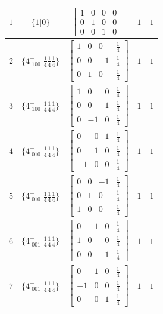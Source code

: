 \documentclass[fleqn,8pt]{jsarticle}
\begin{document}
\begin{longtable}{ccccc}
$ 1 $ & $ \{1|0\} $ & $ \begin{bmatrix} 1 & 0 & 0 & 0 \\ 0 & 1 & 0 & 0 \\ 0 & 0 & 1 & 0 \end{bmatrix} $ & $ 1 $ & $ 1 $ \\ \hline
$ 2 $ & $ \{4^{+}_{\,\,100}|\frac{1}{4} \frac{1}{4} \frac{1}{4}\} $ & $ \begin{bmatrix} 1 & 0 & 0 & \frac{1}{4} \\ 0 & 0 & -1 & \frac{1}{4} \\ 0 & 1 & 0 & \frac{1}{4} \end{bmatrix} $ & $ 1 $ & $ 1 $ \\ \hline
$ 3 $ & $ \{4^{-}_{\,\,100}|\frac{1}{4} \frac{1}{4} \frac{1}{4}\} $ & $ \begin{bmatrix} 1 & 0 & 0 & \frac{1}{4} \\ 0 & 0 & 1 & \frac{1}{4} \\ 0 & -1 & 0 & \frac{1}{4} \end{bmatrix} $ & $ 1 $ & $ 1 $ \\ \hline
$ 4 $ & $ \{4^{+}_{\,\,010}|\frac{1}{4} \frac{1}{4} \frac{1}{4}\} $ & $ \begin{bmatrix} 0 & 0 & 1 & \frac{1}{4} \\ 0 & 1 & 0 & \frac{1}{4} \\ -1 & 0 & 0 & \frac{1}{4} \end{bmatrix} $ & $ 1 $ & $ 1 $ \\ \hline
$ 5 $ & $ \{4^{-}_{\,\,010}|\frac{1}{4} \frac{1}{4} \frac{1}{4}\} $ & $ \begin{bmatrix} 0 & 0 & -1 & \frac{1}{4} \\ 0 & 1 & 0 & \frac{1}{4} \\ 1 & 0 & 0 & \frac{1}{4} \end{bmatrix} $ & $ 1 $ & $ 1 $ \\ \hline
$ 6 $ & $ \{4^{+}_{\,\,001}|\frac{1}{4} \frac{1}{4} \frac{1}{4}\} $ & $ \begin{bmatrix} 0 & -1 & 0 & \frac{1}{4} \\ 1 & 0 & 0 & \frac{1}{4} \\ 0 & 0 & 1 & \frac{1}{4} \end{bmatrix} $ & $ 1 $ & $ 1 $ \\ \hline
$ 7 $ & $ \{4^{-}_{\,\,001}|\frac{1}{4} \frac{1}{4} \frac{1}{4}\} $ & $ \begin{bmatrix} 0 & 1 & 0 & \frac{1}{4} \\ -1 & 0 & 0 & \frac{1}{4} \\ 0 & 0 & 1 & \frac{1}{4} \end{bmatrix} $ & $ 1 $ & $ 1 $ \\ \hline

\end{longtable}
\end{document}
